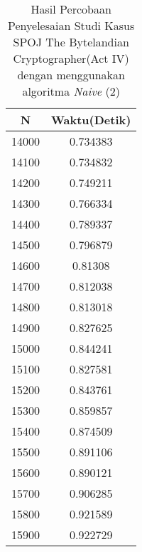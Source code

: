 \begin{table}[H]
\centering
\caption {Hasil Percobaan Penyelesaian Studi Kasus SPOJ The Bytelandian Cryptographer(Act IV) dengan menggunakan algoritma \textit{Naive} (2)}
\begin{tabular}{|c|c|}\hline
N&Waktu(Detik)\\ \hline
14000&0.734383\\ \hline
14100&0.734832\\ \hline
14200&0.749211\\ \hline
14300&0.766334\\ \hline
14400&0.789337\\ \hline
14500&0.796879\\ \hline
14600&0.81308\\ \hline
14700&0.812038\\ \hline
14800&0.813018\\ \hline
14900&0.827625\\ \hline
15000&0.844241\\ \hline
15100&0.827581\\ \hline
15200&0.843761\\ \hline
15300&0.859857\\ \hline
15400&0.874509\\ \hline
15500&0.891106\\ \hline
15600&0.890121\\ \hline
15700&0.906285\\ \hline
15800&0.921589\\ \hline
15900&0.922729\\ \hline
\end{tabular}
\label{tab:res6}
\end{table}
